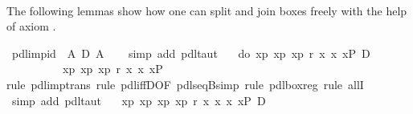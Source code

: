 \begin{isabellebody}
\ \ \isamarkupfalse%
\isanewline
\isamarkupfalse%
\isamarkupfalse%
%
\begin{isamarkuptext}%
The following lemmas show how one can split and join boxes freely with the help
  of axiom .%
\end{isamarkuptext}%
\isamarkuptrue%
\ pdl{\isacharunderscore}imp{\isacharunderscore}id{\isacharcolon}\ {\isachardoublequote}{\isasymturnstile}\ A\ {\isasymlongrightarrow}\isactrlsub D\ A{\isachardoublequote}\isanewline
\ \ \isamarkupfalse%
\ {\isacharparenleft}simp\ add{\isacharcolon}\ pdl{\isacharunderscore}taut{\isacharparenright}\isanewline
\isanewline
\isamarkupfalse%
\ {\isachardoublequote}{\isasymturnstile}\ {\isacharbrackleft}{\isacharhash}\ do\ {\isacharbraceleft}x{}{\isasymleftarrow}p{}{\isacharsemicolon}\ x{}{\isasymleftarrow}p{}{\isacharsemicolon}\ x{}{\isasymleftarrow}p{}{\isacharsemicolon}\ r\ x{}\ x{}\ x{}{\isacharbraceright}{\isacharbrackright}P\ {\isasymlongrightarrow}\isactrlsub D\isanewline
\ \ \ \ \ \ \ \ \ {\isacharbrackleft}{\isacharhash}\ x{}{\isasymleftarrow}p{}{\isacharbrackright}{\isacharbrackleft}{\isacharhash}\ x{}{\isasymleftarrow}p{}{\isacharbrackright}{\isacharbrackleft}{\isacharhash}\ x{}{\isasymleftarrow}p{}{\isacharbrackright}{\isacharbrackleft}{\isacharhash}\ r\ x{}\ x{}\ x{}{\isacharbrackright}P{\isachardoublequote}\isanewline
\ \ \isamarkupfalse%
rule\ pdl{\isacharunderscore}imp{\isacharunderscore}trans{\isacharcomma}\ rule\ pdl{\isacharunderscore}iffD{}{\isacharbrackleft}OF\ pdl{\isacharunderscore}seqB{\isacharunderscore}simp{\isacharbrackright}{\isacharcomma}\ rule\ pdl{\isacharunderscore}box{\isacharunderscore}reg\ {\isacharcomma}rule\ allI{\isacharparenright}{\isacharplus}\isanewline
\ \ \isamarkupfalse%
\ {\isacharparenleft}simp\ add{\isacharcolon}\ pdl{\isacharunderscore}taut{\isacharparenright}\isanewline
\isanewline
\isanewline
\isamarkupfalse%
\ {\isachardoublequote}{\isasymturnstile}\ {\isacharbrackleft}{\isacharhash}\ x{}{\isasymleftarrow}p{}{\isacharbrackright}{\isacharbrackleft}{\isacharhash}\ x{}{\isasymleftarrow}p{}{\isacharbrackright}{\isacharbrackleft}{\isacharhash}\ x{}{\isasymleftarrow}p{}{\isacharbrackright}{\isacharbrackleft}{\isacharhash}\ x{}{\isasymleftarrow}p{}{\isacharbrackright}{\isacharbrackleft}{\isacharhash}\ r\ x{}\ x{}\ x{}\ x{}{\isacharbrackright}P\ {\isasymlongrightarrow}\isactrlsub D\isanewline

\end{isabellebody}
